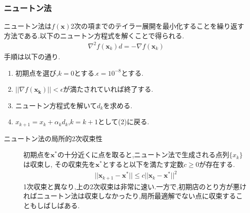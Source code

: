 \documentclass[12pt]{jarticle}
\begin{document}
\subsubsection{ニュートン法}
ニュートン法は$f(\boldsymbol{x})$2次の項までのテイラー展開を最小化することを繰り返す方法である.以下のニュートン方程式を解くことで得られる.
\begin{eqnarray}
    \nabla^2f(\boldsymbol{x}_k)d=-\nabla f(\boldsymbol{x}_k)\nonumber
\end{eqnarray}
手順は以下の通り.
\begin{enumerate}
    \item 初期点を選び,$k=0$とする.$\epsilon=10^{-8}$とする.
    \item $||\nabla f(\boldsymbol{x_k})||<\epsilon$が満たされていれば終了する.
    \item ニュートン方程式を解いて$d_k$を求める.
    \item $x_{k+1}=x_k+\alpha_kd_k$,$k=k+1$として(2)に戻る.
\end{enumerate}
\begin{description}
    \item[ニュートン法の局所的2次収束性] 初期点を$\boldsymbol{x}^*$の十分近くに点を取ると,ニュートン法で生成される点列$\{x_k\}$は収束し,
          その収束先を$\boldsymbol{x}^*$とすると以下を満たす定数$c\geq 0$が存在する.  
          \begin{eqnarray}
              ||\boldsymbol{x}_{k+1}-\boldsymbol{x}^*||\leq c||\boldsymbol{x}_{k}-\boldsymbol{x}^*||^2\nonumber
          \end{eqnarray}
          1次収束と異なり,上の2次収束は非常に速い.一方で,初期店のとり方が悪ければニュートン法は収束しなかったり,局所最適解でない点に収束することもしばしばある.
\end{description}
\end{document}
